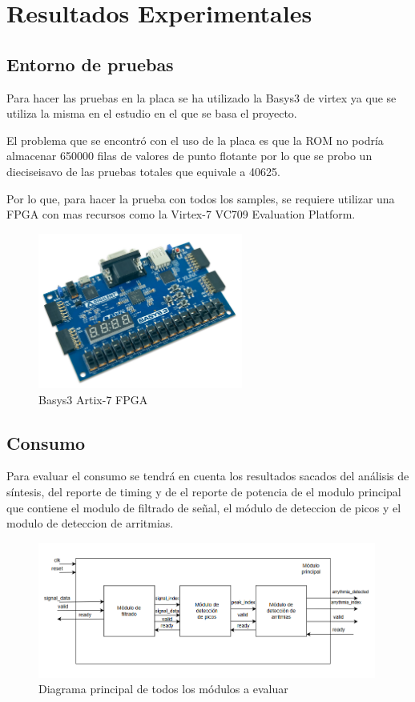 \chapter{Resultados Experimentales}


\section{Entorno de pruebas}
Para hacer las pruebas en la placa se ha utilizado la Basys3 de virtex ya que se utiliza la misma en el estudio en el que se basa el proyecto.

El problema que se encontró con el uso de la placa es que la ROM no podría almacenar 650000 filas de valores de punto flotante por lo que se probo un dieciseisavo de las pruebas totales que equivale a 40625.

Por lo que, para hacer la prueba con todos los samples, se requiere utilizar una FPGA con mas recursos como la Virtex-7 VC709 Evaluation Platform.

\begin{figure}[h]
	\centering
	\includegraphics[width=0.6\textwidth]{./Images/img_introduccion/Basys3.jpg}
	\caption{Basys3 Artix-7 FPGA}
	\label{fig:Basys3}
\end{figure}

\section{Consumo}
	Para evaluar el consumo se tendrá en cuenta los resultados sacados del análisis de síntesis, del reporte de timing y de el reporte de potencia de el modulo principal que contiene el modulo de filtrado de señal,
	el módulo de deteccion de picos y el modulo de deteccion de arritmias. 
	
	\begin{figure}[h!]
		\centering
		\includegraphics[width=0.99\textwidth]{./Images/img_res_experimentales/diagramaGeneral.png}
		\caption{Diagrama principal de todos los módulos a evaluar}
		\label{fig:Diagramaasmfiltrado}
	\end{figure} 

